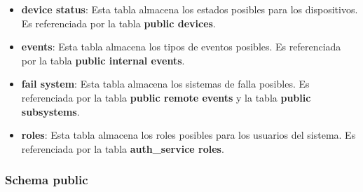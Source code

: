 \begin{itemize}

  \item \textbf{device status}: Esta tabla almacena los estados posibles para los dispositivos. Es referenciada por la tabla \textbf{public devices}.

  \item \textbf{events}: Esta tabla almacena los tipos de eventos posibles. Es referenciada por la tabla \textbf{public internal events}.

  \item \textbf{fail system}: Esta tabla almacena los sistemas de falla posibles. Es referenciada por la tabla \textbf{public remote events} y la tabla \textbf{public subsystems}.

  \item \textbf{roles}: Esta tabla almacena los roles posibles para los usuarios del sistema. Es referenciada por la tabla \textbf{auth\_service roles}.

\end{itemize}


\subsubsection{Schema public}

